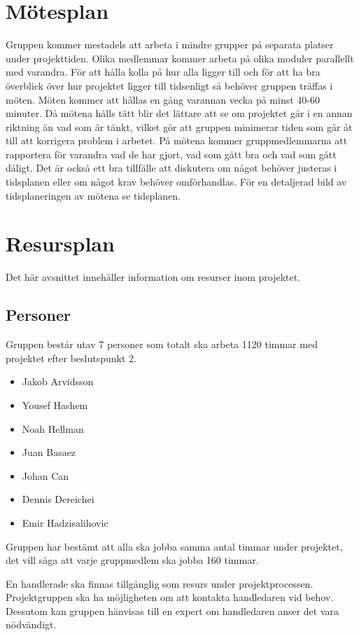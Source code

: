 \documentclass[projektplan/plan.tex]{subfiles}
\begin{document}
\section{Mötesplan}
Gruppen kommer mestadels att arbeta i mindre grupper på separata platser under
projekttiden. Olika medlemmar kommer arbeta på olika moduler parallellt med
varandra. För att hålla kolla på hur alla ligger till och för att ha bra
överblick över hur projektet ligger till tidsenligt så behöver gruppen träffas
i möten. Möten kommer att hållas en gång varannan vecka på minst 40-60 minuter.
Då mötena hålls tätt blir det lättare att se om projektet går i en annan
riktning än vad som är tänkt, vilket gör att gruppen minimerar tiden som går åt
till att korrigera problem i arbetet. På mötena kommer gruppmedlemmarna att rapportera
för varandra vad de har gjort, vad som gått bra och vad som gått dåligt. Det är
också ett bra tillfälle att diskutera om något behöver justeras i tidsplanen
eller om något krav behöver omförhandlas. För en detaljerad bild av
tidsplaneringen av mötena se tidsplanen.

\section{Resursplan}
Det här avsnittet innehåller information om resurser inom projektet.

\subsection{Personer}
Gruppen består utav 7 personer som totalt ska arbeta 1120 timmar med projektet
efter beslutspunkt 2.

\begin{itemize}
    \item Jakob Arvidsson
    \item Yousef Hashem
    \item Noah Hellman
    \item Juan Basaez
    \item Johan Can
    \item Dennis Dereichei
    \item Emir Hadzisalihovic
\end{itemize}
Gruppen har bestämt att alla ska jobba samma antal timmar under projektet, det
vill säga att varje gruppmedlem ska jobba 160 timmar.

En handlerade ska finnas tillgänglig som resurs under projektprocessen.
Projektgruppen ska ha möjligheten om att kontakta handledaren vid behov.
Dessutom kan gruppen hänvisas till en expert om handledaren anser det vara
nödvändigt.
\end{document}
